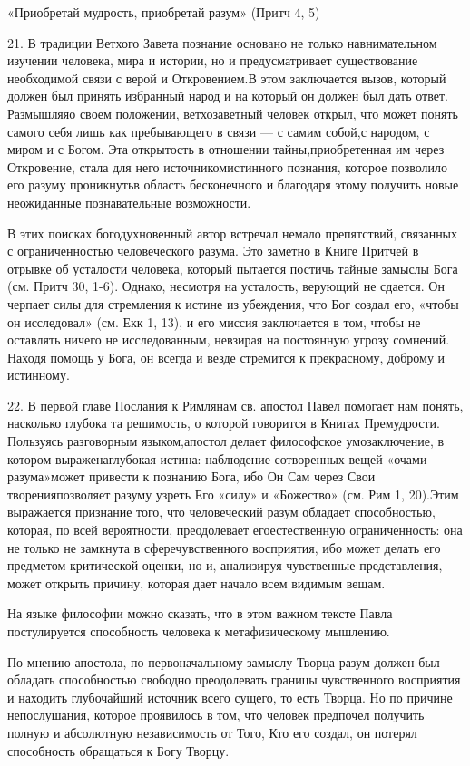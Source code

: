 \documentclass[a5paper,10pt]{article}
\begin{document}
«Приобретай мудрость, приобретай разум» (Притч 4, 5)

21. В традиции Ветхого Завета познание основано не только навнимательном
изучении человека, мира и истории, но и предусматривает существование
необходимой связи с верой и Откровением.В этом заключается вызов, который
должен был принять избранный народ и на который он должен был дать ответ.
Размышляяо своем положении, ветхозаветный человек открыл, что может понять
самого себя лишь как пребывающего в связи — с самим собой,с народом, с миром и
с Богом. Эта открытость в отношении тайны,приобретенная им через Откровение,
стала для него источникомистинного познания, которое позволило его разуму
проникнутьв область бесконечного и благодаря этому получить новые неожиданные
познавательные возможности.

В этих поисках богодухновенный автор встречал немало препятствий, связанных с
ограниченностью человеческого разума. Это заметно в Книге Притчей в отрывке об
усталости человека, который пытается постичь тайные замыслы Бога (см. Притч 30,
1-6). Однако, несмотря на усталость, верующий не сдается. Он черпает силы для
стремления к истине из убеждения, что Бог создал его, «чтобы он исследовал»
(см. Екк 1, 13), и его миссия заключается в том, чтобы не оставлять ничего не
исследованным, невзирая на постоянную угрозу сомнений. Находя помощь у Бога, он
всегда и везде стремится к прекрасному, доброму и истинному.

22. В первой главе Послания к Римлянам св. апостол Павел помогает нам понять,
насколько глубока та решимость, о которой говорится в Книгах Премудрости.
Пользуясь разговорным языком,апостол делает философское умозаключение, в
котором выраженаглубокая истина: наблюдение сотворенных вещей «очами
разума»может привести к познанию Бога, ибо Он Сам через Свои творенияпозволяет
разуму узреть Его «силу» и «Божество» (см. Рим 1, 20).Этим выражается признание
того, что человеческий разум обладает способностью, которая, по всей
вероятности, преодолевает егоестественную ограниченность: она не только не
замкнута в сферечувственного восприятия, ибо может делать его предметом
критической оценки, но и, анализируя чувственные представления, может открыть
причину, которая дает начало всем видимым вещам.

На языке философии можно сказать, что в этом важном тексте Павла постулируется
способность человека к метафизическому мышлению.

По мнению апостола, по первоначальному замыслу Творца разум должен был обладать
способностью свободно преодолевать границы чувственного восприятия и находить
глубочайший источник всего сущего, то есть Творца. Но по причине непослушания,
которое проявилось в том, что человек предпочел получить полную и абсолютную
независимость от Того, Кто его создал, он потерял способность обращаться к Богу
Творцу.
\end{document}
